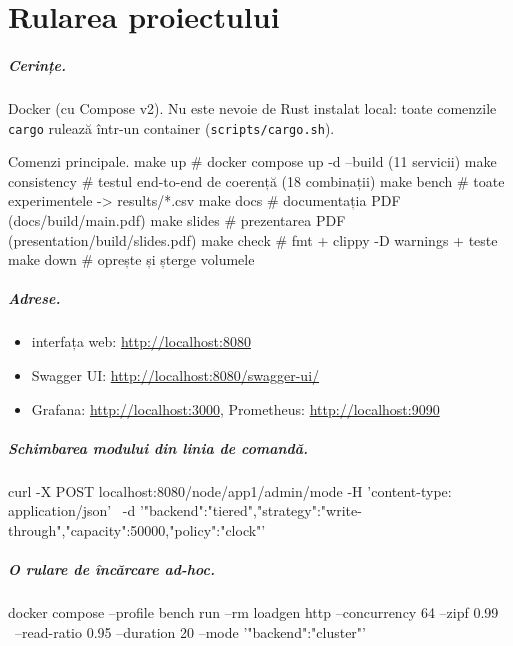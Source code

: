 \chapter{Rularea proiectului}
\label{ch:rulare}

\paragraph{Cerințe.} Docker (cu Compose v2). Nu este nevoie de Rust instalat local: toate comenzile
\texttt{cargo} rulează într-un container (\texttt{scripts/cargo.sh}).

\begin{code}{Comenzi principale.}
make up            # docker compose up -d --build (11 servicii)
make consistency   # testul end-to-end de coerență (18 combinații)
make bench         # toate experimentele -> results/*.csv
make docs          # documentația PDF (docs/build/main.pdf)
make slides        # prezentarea PDF (presentation/build/slides.pdf)
make check         # fmt + clippy -D warnings + teste
make down          # oprește și șterge volumele
\end{code}

\paragraph{Adrese.}
\begin{itemize}
  \item interfața web: \url{http://localhost:8080}
  \item Swagger UI: \url{http://localhost:8080/swagger-ui/}
  \item Grafana: \url{http://localhost:3000}, Prometheus: \url{http://localhost:9090}
\end{itemize}

\paragraph{Schimbarea modului din linia de comandă.}
\begin{code}{}
curl -X POST localhost:8080/node/app1/admin/mode -H 'content-type: application/json' \
     -d '{"backend":"tiered","strategy":"write-through","capacity":50000,"policy":"clock"}'
\end{code}

\paragraph{O rulare de încărcare ad-hoc.}
\begin{code}{}
docker compose --profile bench run --rm loadgen http --concurrency 64 --zipf 0.99 \
     --read-ratio 0.95 --duration 20 --mode '{"backend":"cluster"}'
\end{code}
